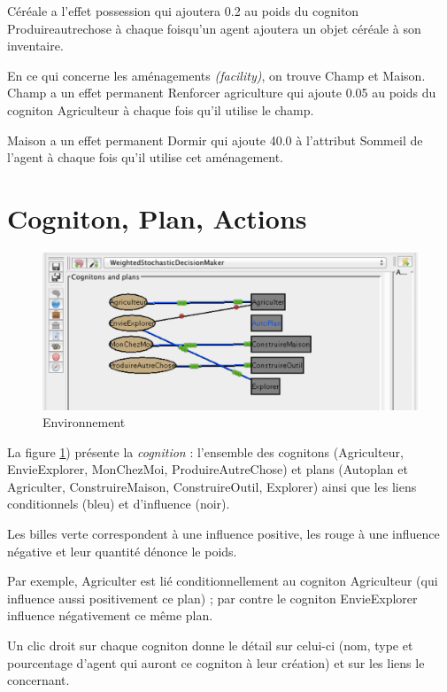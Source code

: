 \documentclass[a4paper,oneside,12 pt]{article}
\begin{document}
Céréale a l'effet possession qui ajoutera 0.2 au poids du cogniton Produireautrechose à chaque foisqu'un agent ajoutera un objet céréale à son inventaire.

En ce qui concerne les aménagements \textit{(facility)}, on trouve Champ et Maison.
Champ a un effet permanent Renforcer agriculture qui ajoute  0.05 au poids du cogniton Agriculteur à chaque fois qu'il utilise le champ.

Maison a un effet permanent Dormir qui ajoute 40.0 à l'attribut Sommeil de l'agent à chaque fois qu'il utilise cet aménagement.

\section{Cogniton, Plan, Actions}



\begin{figure}[!ht]
\begin{center}
\includegraphics[scale=0.5]{CogPl.pdf}
\caption[CP]{Environnement \\}
\label{CP}
\end{center}
\end{figure} 

La figure \ref{CP}) présente la \textit{cognition} : l'ensemble des cognitons (Agriculteur, EnvieExplorer, MonChezMoi, ProduireAutreChose) et plans (Autoplan et Agriculter, ConstruireMaison, ConstruireOutil, Explorer) ainsi que les liens conditionnels (bleu) et d'influence (noir).

Les billes verte correspondent à une influence positive, les rouge à une influence négative et leur quantité dénonce le poids.

Par exemple, Agriculter est lié conditionnellement au cogniton Agriculteur (qui influence aussi positivement ce plan) ; par contre  le cogniton EnvieExplorer influence négativement ce même plan.

Un clic droit sur chaque cogniton donne le détail sur celui-ci (nom, type et pourcentage d'agent qui auront     ce cogniton à leur création) et sur les liens le concernant.
\end{document}
